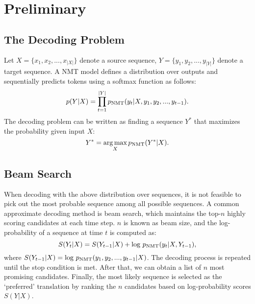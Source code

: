 \documentclass{article}
\begin{document}


\section{Preliminary}
\subsection{The Decoding Problem}
Let $X=\{x_1,x_2,...,x_{|X|}\}$ denote a source sequence, $Y=\{y_1,y_2,...,y_{|Y|}\}$ denote a target sequence. A NMT model defines a distribution over outputs and sequentially predicts tokens using a softmax function as follows:
\begin{equation}
p(Y|X)=\prod_{t=1}^{|Y|}p\textsubscript{NMT}(y_t|X,y_1,y_2,...,y_{t-1}).
\end{equation}
The decoding problem can be written as finding a sequence $Y^\ast$ that maximizes the probability given input $X$:
\begin{equation}
Y^\ast= \mathop{\arg\max}\limits_{X} p\textsubscript{NMT}(Y^\ast|X).
\end{equation}

\subsection{Beam Search}
When decoding with the above distribution over sequences, it is not feasible to pick out the most probable sequence among all possible sequences. A common approximate decoding method is beam search, which maintains the top-$n$ highly scoring candidates at each time step. $n$ is known as beam size, and the log-probability of a sequence at time $t$ is computed as:
\begin{equation}
S(Y_{t}|X)= S(Y_{t-1}|X)+\text{log } p\textsubscript{NMT}(y_t|X,Y_{t-1}),
\end{equation}
where $S(Y_{t-1}|X)=\text{log } p\textsubscript{NMT}(y_1,y_2,...,y_{t-1}|X)$. The decoding process is repeated until the stop condition is met. After that, we can obtain a list of $n$ most promising candidates. Finally, the most likely sequence is selected as the ‘preferred’ translation by ranking the $n$ candidates based on log-probability scores $S(Y|X)$. 
\end{document}

